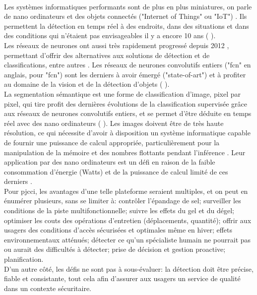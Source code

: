 \vspace{\baselineskip}
\\
\noindent Les systèmes informatiques performants sont de plus en plus miniatures, on parle de nano ordinateurs et des objets connectés ("Internet of Things" ou "IoT") \cite{blanco-filgueira_deep_2019} \cite{sharma_history_2019}. Ils permettent la détection en temps réel à des endroits, dans des situations et dans des conditions qui n'étaient pas envisageables il y a encore 10 ans (\cite{zheng_real-time_2020} \cite{bernas_edge_2017} \cite{abouzahir_iot-empowered_2017} \cite{blanco-filgueira_deep_2019}).
\vspace{\baselineskip}
\\
\noindent Les réseaux de neurones ont aussi très rapidement progressé depuis 2012 \cite{beam_deep_2017}, permettant d'offrir des alternatives aux solutions de détection et de classifications, entre autres \cite{pathak_architecturally_2019}. Les réseaux de neurones convolutifs entiers ("\acrshort{fcn}" en anglais, pour "\acrlong{fcn}") sont les derniers à avoir émergé ("state-of-art") \cite{zheng_real-time_2020} et à profiter au domaine de la vision et de la détection d'objets (\cite{nguyen_mavnet_2019} \cite{zheng_real-time_2020}).
\vspace{\baselineskip}
\\
\noindent La segmentation sémantique est une forme de classification d'image, pixel par pixel, qui tire profit des dernières évolutions de la classification supervisée grâce aux réseaux de neurones convolutifs entiers, et se permet d'être déduite en temps réel avec des nano ordinateurs (\cite{long_fully_2015} \cite{blanco-filgueira_deep_2019}). Les images doivent être de très haute résolution, ce qui nécessite d'avoir à disposition un système informatique capable de fournir une puissance de calcul appropriée, particulièrement pour la manipulation de la mémoire et des nombres flottants pendant l'inférence \cite{mody_low_2018}. Leur application par des nano ordinateurs est un défi en raison de la faible consommation d'énergie (Watts) et de la puissance de calcul limité de ces derniers \cite{copel_whats_2016}.
\vspace{\baselineskip}
\\
\noindent Pour \acrshort{pjcci}, les avantages d'une telle plateforme seraient multiples, et on peut en énumérer plusieurs, sans se limiter à: contrôler l'épandage de sel; surveiller les conditions de la piste multifonctionnelle; suivre les effets du gel et du dégel; optimiser les couts des opérations d'entretien (déplacements, quantité); offrir aux usagers des conditions d'accès sécurisées et optimales même en hiver; effets environnementaux atténués; détecter ce qu'un spécialiste humain ne pourrait pas ou aurait des difficultés à détecter; prise de décision et gestion proactive; planification.
\vspace{\baselineskip}
\\
\noindent D'un autre côté, les défis ne sont pas à sous-évaluer: la détection doit être précise, fiable et consistante, tout cela afin d'assurer aux usagers un service de qualité dans un contexte sécuritaire.